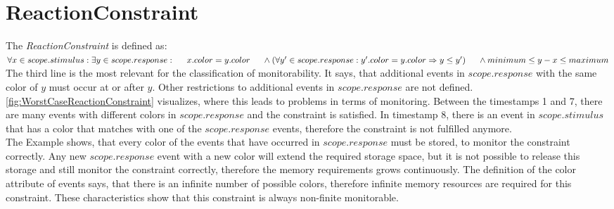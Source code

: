 \section{ReactionConstraint}
	The \emph{ReactionConstraint} is defined as:
	\\[10pt]
	\begin{math}
		\forall x\in scope.stimulus: \exists y\in scope.response:\\
		\text{\hspace{.5cm}}x.color=y.color\\
		\text{\hspace{.5cm}}\land (\forall y'\in scope.response: y'.color=y.color\Rightarrow y\leq y')\\
		\text{\hspace{.5cm}}\land minimum \leq y-x \leq maximum
	\end{math}\\[10pt]
	The third line is the most relevant for the classification of monitorability. It says, that additional events in $scope.response$ with the same color of $y$ must occur at or after $y$. Other restrictions to additional events in $scope.response$ are not defined.\\
	\ref{fig:WorstCaseReactionConstraint} visualizes, where this leads to problems in terms of monitoring. Between the timestamps 1 and 7, there are many events with different colors in $scope.response$ and the constraint is satisfied. In timestamp 8, there is an event in $scope.stimulus$ that has a color that matches with one of the $scope.response$ events, therefore the constraint is not fulfilled anymore.\\
	The Example shows, that every color of the events that have occurred in $scope.response$ must be stored, to monitor the constraint correctly. Any new $scope.response$ event with a new color will extend the required storage space, but it is not possible to release this storage and still monitor the constraint correctly, therefore the memory requirements grows continuously. The definition of the color attribute of events says, that there is an infinite number of possible colors, therefore infinite memory resources are required for this constraint.
	These characteristics show that this constraint is always non-finite monitorable.
